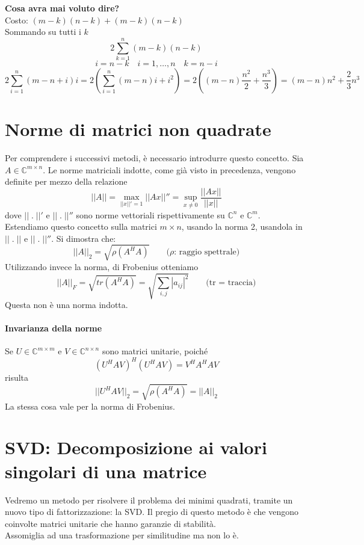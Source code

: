 \begin{workinprogress} \textbf{Cosa avra mai voluto dire?} \\ Costo:
$(m-k) (n-k) + (m-k)(n-k)$ \\ Sommando su tutti i $k$
$$
\displaystyle 2 \sum_{k=1}^{n} (m-k)(n-k)
$$
$$i =n-k \quad i =1, \ldots, n \quad k = n-i$$
$$ 
2 \displaystyle \sum_{i=1}^{n} (m-n+i)i = 2 (\displaystyle
\sum_{i=1}^{n} (m-n) i + \displaystyle i^{2}) = 2 (( m-n)
\frac{n^{2}}{2} + \frac{n^3}{3}) = (m-n)n^{2} + \frac{2}{3}n^{3}
$$   
\end{workinprogress}

\section{Norme di matrici non quadrate} Per comprendere i successivi
metodi, \`e necessario introdurre questo concetto.  Sia $A \in
\mathbb{C}^{m\times n}$. Le norme matriciali indotte, come gi\`a visto
in precedenza, vengono definite per mezzo della relazione
$$ || A|| = \max_{||x||' = 1} ||Ax ||'' = \sup_{x \neq 0}
\frac{||Ax||}{||x||}
$$
dove $|| \; . \; ||'$ e $|| \; . \; ||''$ sono norme vettoriali
rispettivamente su $\mathbb{C}^{n}$ e $\mathbb{C}^{m}$. \\ Estendiamo
questo concetto sulla matrici $m \times n$, usando la norma 2,
usandola in $|| \; . \; ||$ e $|| \; . \; ||''$.  Si dimostra che:
$$ || A||_{2} = \sqrt{\rho(A^{H}A)}
\qquad \text{($\rho$: raggio spettrale)}
$$
Utilizzando invece la norma, di Frobenius otteniamo
$$ ||A||_{F} = \sqrt{tr(A^{H}A)} =
\sqrt{\displaystyle \sum_{i,j}|a_{ij}|^{2} } \qquad \text{(tr =
traccia)}
$$ 
Questa non è una norma indotta.

\paragraph{Invarianza della norme} Se $U \in \mathbb{C}^{m \times m}$
e $V \in \mathbb{C}^{n\times n}$ sono matrici unitarie, poiché
$$ (U^{H}AV)^{H}(U^{H}AV) = V^{H}A^{H}AV$$
risulta
$$|| U^{H}AV||_{2} = \sqrt{\rho(A^{H}A)} = ||A||_{2}$$
La stessa cosa vale per la norma di Frobenius. \\

\section{SVD: Decomposizione ai valori singolari di una matrice }
Vedremo un metodo per risolvere il problema dei minimi quadrati,
tramite un nuovo tipo di fattorizzazione: la SVD.  Il pregio di questo
metodo \`e che vengono coinvolte matrici unitarie che hanno garanzie di
stabilità. \\ 
Assomiglia ad una trasformazione per similitudine ma non lo \`e.


